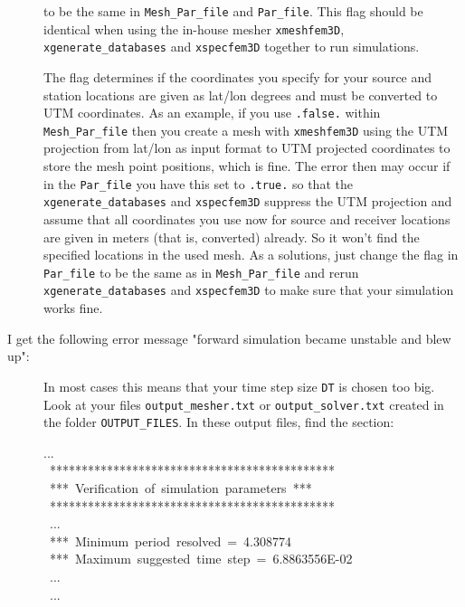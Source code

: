 \begin{description}
\begin{lyxcode}
\end{lyxcode}

to be the same in \texttt{Mesh\_Par\_file} and \texttt{Par\_file}.
This flag should be identical when using the in-house mesher \texttt{xmeshfem3D},
\texttt{xgenerate\_databases} and \texttt{xspecfem3D} together to
run simulations.


The flag determines if the coordinates you specify for your source
and station locations are given as lat/lon degrees and must be converted
to UTM coordinates. As an example, if you use \texttt{.false.} within
\texttt{Mesh\_Par\_file} then you create a mesh with \texttt{xmeshfem3D}
using the UTM projection from lat/lon as input format to UTM projected
coordinates to store the mesh point positions, which is fine. The
error then may occur if in the \texttt{Par\_file} you have this set
to \texttt{.true.} so that the \texttt{xgenerate\_databases} and \texttt{xspecfem3D}
suppress the UTM projection and assume that all coordinates you use
now for source and receiver locations are given in meters (that is,
converted) already. So it won't find the specified locations in the
used mesh. As a solutions, just change the flag in \texttt{Par\_file}
to be the same as in \texttt{Mesh\_Par\_file} and rerun \texttt{xgenerate\_databases}
and \texttt{xspecfem3D} to make sure that your simulation works fine.

\item [{I get the following error message "forward simulation became unstable and blew up":}] In
most cases this means that your time step size \texttt{DT} is chosen
too big. Look at your files \texttt{output\_mesher.txt} or \texttt{output\_solver.txt}
created in the folder \texttt{OUTPUT\_FILES}. In these output files,
find the section:

\begin{lyxcode}
...~~~\\
~{*}{*}{*}{*}{*}{*}{*}{*}{*}{*}{*}{*}{*}{*}{*}{*}{*}{*}{*}{*}{*}{*}{*}{*}{*}{*}{*}{*}{*}{*}{*}{*}{*}{*}{*}{*}{*}{*}{*}{*}{*}{*}{*}{*}{*}~~~\\
~{*}{*}{*}~Verification~of~simulation~parameters~{*}{*}{*}~~~\\
~{*}{*}{*}{*}{*}{*}{*}{*}{*}{*}{*}{*}{*}{*}{*}{*}{*}{*}{*}{*}{*}{*}{*}{*}{*}{*}{*}{*}{*}{*}{*}{*}{*}{*}{*}{*}{*}{*}{*}{*}{*}{*}{*}{*}{*}~~~\\
~...~~~\\
~{*}{*}{*}~Minimum~period~resolved~=~4.308774~~~\\
~{*}{*}{*}~Maximum~suggested~time~step~=~6.8863556E-02~~~\\
~...~~~\\
~...~~~\\


\end{lyxcode}
\end{description}
